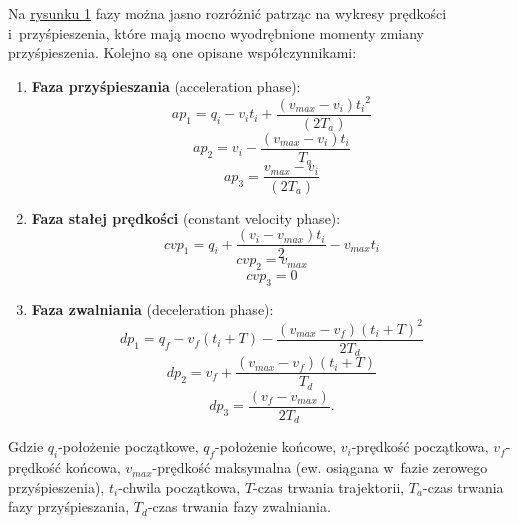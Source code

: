\documentclass[a4paper, 12pt]{article}
\begin{document}
	\par Na \hyperref[fig:trajtrapez]{rysunku 1} fazy można jasno rozróżnić patrząc na wykresy prędkości i~przyśpieszenia, które mają mocno wyodrębnione momenty zmiany przyśpieszenia. Kolejno są one opisane współczynnikami:
	\begin{enumerate}
	\item \textbf{Faza przyśpieszania} (acceleration phase):
		\begin{equation}
		\label{eq:ap1}
		ap_1 = q_i - v_it_i + \frac{(v_{max}-v_i){t_i}^2}{(2T_a)}
		\end{equation}
		\begin{equation}
		\label{eq:ap2}
		ap_2 = v_i - \frac{(v_{max}-v_i)t_i}{T_a}
		\end{equation}
		\begin{equation}
		\label{eq:ap3}
		ap_3 = \frac{v_{max}-v_i}{(2T_a)}
		\end{equation}

	\item \textbf{Faza stałej prędkości} (constant velocity phase):
		\begin{equation}
		\label{eq:cvp1}
		cvp_1 = q_i + \frac{(v_i-v_{max})t_i}{2}- v_{max}t_i
		\end{equation}
		\begin{equation}
		\label{eq:cvp2}
		cvp_2 = v_{max}
		\end{equation}
		\begin{equation}
		\label{eq:cvp3}
		cvp_3 = 0
		\end{equation}
	\item \textbf{Faza zwalniania} (deceleration phase):
		\begin{equation}
		\label{eq:dp1}
		dp_1 = q_f - v_f(t_i+T) - \frac{(v_{max}-v_f)(t_i+T)^2}{2T_d}
		\end{equation}
		\begin{equation}
		\label{eq:dp2}
		dp_2 = v_f + \frac{(v_{max}-v_f)(t_i+T)}{T_d}
		\end{equation}
		\begin{equation}
		\label{eq:dp3}
		dp_3 = \frac{(v_f-v_{max})}{2T_d}.
		\end{equation}
	\end{enumerate}
	{\footnotesize Gdzie $ q_i $-położenie początkowe, $ q_f $-położenie końcowe, $ v_i $-prędkość początkowa, $ v_f $-prędkość końcowa, $ v_{max} $-prędkość maksymalna (ew. osiągana w~fazie zerowego przyśpieszenia), $ t_i $-chwila początkowa, $ T $-czas trwania trajektorii, $ T_a $-czas trwania fazy przyśpieszania, $ T_d $-czas trwania fazy zwalniania.}
\end{document}
